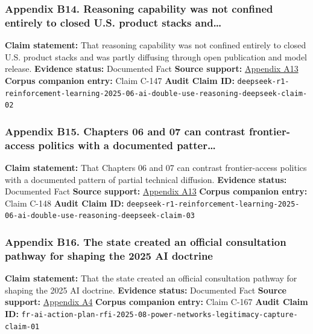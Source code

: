\documentclass[
  american,
  11pt,
  letterpaper,
]{article}
\begin{document}
\subsubsection{Appendix B14. Reasoning capability was not confined
entirely to closed U.S. product stacks
and\ldots{}}\label{appendix-b14-reasoning-capability-was-not-confined-entirely-to-closed-u-s-product-stacks-and}

\textbf{Claim statement:} That reasoning capability was not confined
entirely to closed U.S. product stacks and was partly diffusing through
open publication and model release. \textbf{Evidence status:} Documented
Fact \textbf{Source support:}
\hyperref[appendix-a13-deepseek-r1-incentivizing-reasoning-capability-in-llms-via-reinforcement-learning]{Appendix
A13} \textbf{Corpus companion entry:} Claim C-147 \textbf{Audit Claim
ID:}
\texttt{deepseek-r1-reinforcement-learning-2025-06-ai-double-use-reasoning-deepseek-claim-02}

\subsubsection{Appendix B15. Chapters 06 and 07 can contrast
frontier-access politics with a documented
patter\ldots{}}\label{appendix-b15-chapters-06-and-07-can-contrast-frontier-access-politics-with-a-documented-patter}

\textbf{Claim statement:} That Chapters 06 and 07 can contrast
frontier-access politics with a documented pattern of partial technical
diffusion. \textbf{Evidence status:} Documented Fact \textbf{Source
support:}
\hyperref[appendix-a13-deepseek-r1-incentivizing-reasoning-capability-in-llms-via-reinforcement-learning]{Appendix
A13} \textbf{Corpus companion entry:} Claim C-148 \textbf{Audit Claim
ID:}
\texttt{deepseek-r1-reinforcement-learning-2025-06-ai-double-use-reasoning-deepseek-claim-03}

\subsubsection{Appendix B16. The state created an official consultation
pathway for shaping the 2025 AI
doctrine}\label{appendix-b16-the-state-created-an-official-consultation-pathway-for-shaping-the-2025-ai-doctrine}

\textbf{Claim statement:} That the state created an official
consultation pathway for shaping the 2025 AI doctrine. \textbf{Evidence
status:} Documented Fact \textbf{Source support:}
\hyperref[appendix-a4-request-for-information-on-the-development-of-an-artificial-intelligence-ai-action-plan]{Appendix
A4} \textbf{Corpus companion entry:} Claim C-167 \textbf{Audit Claim
ID:}
\texttt{fr-ai-action-plan-rfi-2025-08-power-networks-legitimacy-capture-claim-01}
\end{document}
